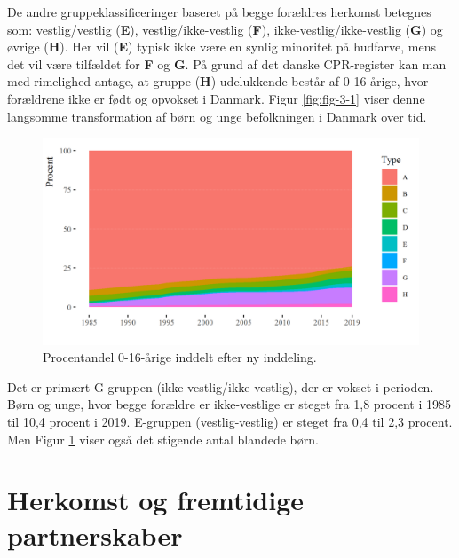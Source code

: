 \documentclass[
]{book}
\begin{document}
De andre gruppeklassificeringer baseret på begge forældres herkomst betegnes som: vestlig/vestlig (\textbf{E}), vestlig/ikke-vestlig (\textbf{F}), ikke-vestlig/ikke-vestlig (\textbf{G}) og øvrige (\textbf{H}). Her vil (\textbf{E}) typisk ikke være en synlig minoritet på hudfarve, mens det vil være tilfældet for \textbf{F} og \textbf{G}. På grund af det danske CPR-register kan man med rimelighed antage, at gruppe (\textbf{H}) udelukkende består af 0-16-årige, hvor forældrene ikke er født og opvokset i Danmark. Figur \ref{fig:fig-3-1} viser denne langsomme transformation af børn og unge befolkningen i Danmark over tid.

\begin{figure}
\includegraphics[width=1\linewidth]{images/figur_3_1} \caption{ Procentandel 0-16-årige inddelt efter ny inddeling.}\label{fig:fig-3-01}
\end{figure}

Det er primært G-gruppen (ikke-vestlig/ikke-vestlig), der er vokset i perioden. Børn og unge, hvor begge forældre er ikke-vestlige er steget fra 1,8 procent i 1985 til 10,4 procent i 2019. E-gruppen (vestlig-vestlig) er steget fra 0,4 til 2,3 procent. Men Figur \ref{fig:fig-3-01} viser også det stigende antal blandede børn.

\section{Herkomst og fremtidige partnerskaber}\label{herkomst-og-fremtidige-partnerskaber}
\end{document}
